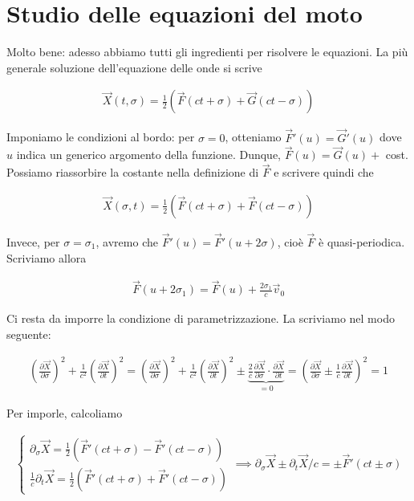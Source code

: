\documentclass{report}
\begin{document}
\section{Studio delle equazioni del moto}

Molto bene: adesso abbiamo tutti gli ingredienti per risolvere le equazioni. La più generale soluzione dell'equazione delle onde si scrive 

\begin{align}
    \vec{X}(t, \sigma) = \frac{1}{2}(\vec{F}(ct+\sigma) + \vec{G}(ct -\sigma))
\end{align}

Imponiamo le condizioni al bordo: per \(\sigma = 0\), otteniamo \(\vec{F}'(u) = \vec{G}' (u)\) dove \(u\) indica un generico argomento della funzione. Dunque, \(\vec{F}(u) = \vec{G}(u) +\) cost. Possiamo riassorbire la costante nella definizione di \(\vec{F}\) e scrivere quindi che 

\begin{align}
    \vec{X}(\sigma, t) = \frac{1}{2}(\vec{F}(ct + \sigma) + \vec{F}(ct-\sigma))
\end{align}

Invece, per \(\sigma = \sigma_1\), avremo che \(\vec{F}'(u) = \vec{F}'(u+2\sigma)\), cioè \(\vec{F}\) è quasi-periodica. Scriviamo allora 

\begin{align}
    \vec{F}(u+2\sigma_1) = \vec{F}(u) + \frac{2\sigma_1}{c}\vec{v}_0
\end{align}

Ci resta da imporre la condizione di parametrizzazione. La scriviamo nel modo seguente: 

\begin{align}
    \left(\frac{\partial \vec{X}}{\partial \sigma} \right)^2 + \frac{1}{c^2}\left(\frac{\partial \vec{X}}{\partial t} \right)^2 = \left(\frac{\partial \vec{X}}{\partial \sigma} \right)^2 + \frac{1}{c^2}\left(\frac{\partial \vec{X}}{\partial t} \right)^2 \pm \underbrace{\frac{2}{c}\frac{\partial \vec{X}}{\partial \sigma}\cdot \frac{\partial \vec{X}}{\partial t}}_{=0} = \left(\frac{\partial \vec{X}}{\partial \sigma} \pm \frac{1}{c}\frac{\partial \vec{X}}{\partial t} \right)^2 = 1  
\end{align}

Per imporle, calcoliamo 

\begin{align}
    \begin{cases}
        \partial_\sigma \vec{X} = \frac{1}{2}(\vec{F}'(ct+\sigma) - \vec{F}'(ct-\sigma)) \\
        \frac{1}{c}\partial_t \vec{X} = \frac{1}{2}(\vec{F}'(ct+\sigma) + \vec{F}'(ct-\sigma))
    \end{cases} \implies \partial_\sigma\vec{X} \pm \partial_t\vec{X}/c = \pm \vec{F}'(ct\pm\sigma)
\end{align}
\end{document}
